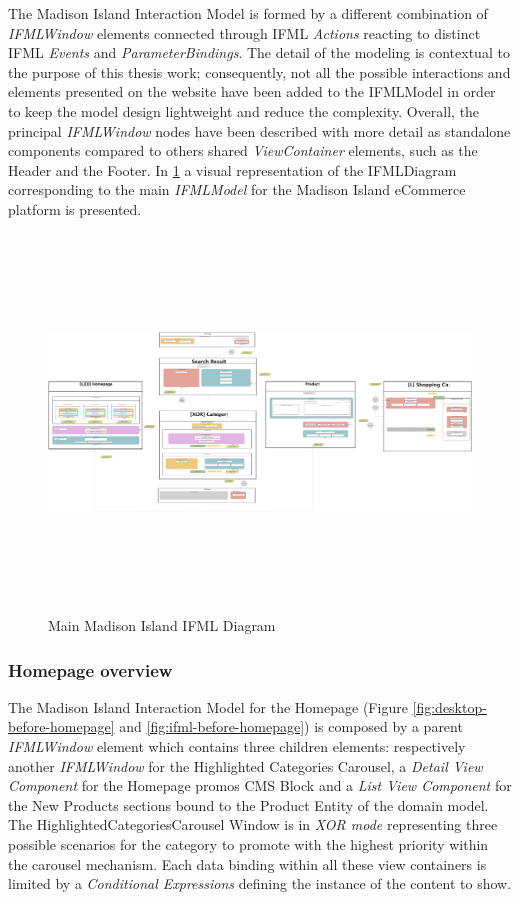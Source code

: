 The Madison Island Interaction Model is formed by a different combination of \textit{IFMLWindow} elements connected through IFML \textit{Actions} reacting to distinct IFML \textit{Events} and  \textit{ParameterBindings}. The detail of the modeling is contextual to the purpose of this thesis work; consequently, not all the possible interactions and elements presented on the website have been added to the IFMLModel in order to keep the model design lightweight and reduce the complexity. Overall, the principal \textit{IFMLWindow} nodes have been described with more detail as standalone components compared to others shared \textit{ViewContainer} elements, such as the Header and the Footer. In   \ref{fig:ifml-before-global} a visual representation of the IFMLDiagram corresponding to the main \textit{IFMLModel} for the Madison Island eCommerce platform is presented.

\begin{figure}[H]
  \centering
    \includegraphics[height=10cm,angle=-90] {images/diagrams/before/ifml-global.png}
  \caption{Main Madison Island IFML Diagram}
  \label{fig:ifml-before-global}
\end{figure}

\subsubsection{Homepage overview}

The Madison Island Interaction Model for the Homepage (Figure \ref{fig:desktop-before-homepage} and \ref{fig:ifml-before-homepage}) is composed by a parent \textit{IFMLWindow} element which contains three children elements: respectively another \textit{IFMLWindow} for the Highlighted Categories Carousel, a \textit{Detail View Component} for the Homepage promos CMS Block and a \textit{List View Component} for the New Products sections bound to the Product Entity of the domain model. The HighlightedCategoriesCarousel Window is in \textit{XOR mode} representing three possible scenarios for the category to promote with the highest priority within the carousel mechanism. Each data binding within all these view containers is limited by a \textit{Conditional Expressions} defining the instance of the content to show.

